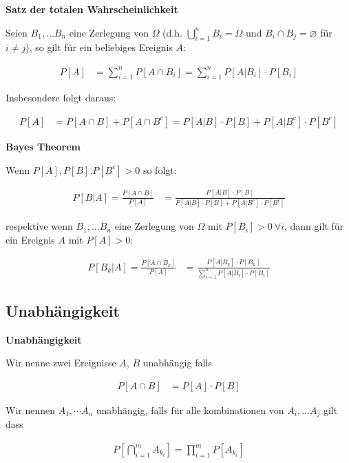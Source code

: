 \documentclass[25pt]{sciposter}
\newenvironment{method}[1]{\begin{mdframed}[backgroundcolor=blue!10,innertopmargin=15pt, innerbottommargin=15pt,nobreak=true]
		\textbf{#1 }
	}
	{ 
	\end{mdframed}
}
\newenvironment{thm}[1]{\begin{mdframed}[backgroundcolor=pink!50,innertopmargin=15pt, innerbottommargin=15pt, nobreak=true]
		\textbf{#1 }
	}
	{ 
	\end{mdframed}
}
\begin{document}
\begin{multicols}{3}
\begin{thm}{Satz der totalen Wahrscheinlichkeit}
	 Seien $B_1, \ldots B_n$ eine Zerlegung von $\Omega$ (d.h. $\bigcup_{i=1}^n B_i = \Omega$ und $B_i \cap B_j = \varnothing$ für $i\neq j$), so gilt für ein beliebiges Ereignis $A$:
	 
	 \begin{align*}
	 	P[A] &= \sum_{i=1}^{n} P[A\cap B_i] = \sum_{i=1}^{n} P[A|B_i]\cdot P[B_i]
	 \end{align*}
	 
	 Insbesondere folgt daraus:
	 
	 \begin{align*}
	 	P[A] &= P[A\cap B] + P[A \cap B^c] = P[A|B]\cdot P[B] + P[A|B^c]\cdot P[B^c]
	 \end{align*}
\end{thm}


\begin{thm}{Bayes Theorem}
	Wenn $P[A],P[B].P[B^c]> 0$ so folgt:
	
	\begin{align*}
		P[B|A] = \frac{P[A\cap B]}{P[A]} &= \frac{P[A|B]\cdot P[B]}{P[A|B]\cdot P[B] + P[A|B^c]\cdot P[B^c]}
	\end{align*}
	
	respektive wenn $B_1, \ldots B_n$ eine Zerlegung von $\Omega$ mit $P[B_i]>0 \  \forall i$, dann gilt für ein Ereignis $A$ mit $P[A]>0$:
	
	\begin{align*}
		P[B_k|A] = \frac{P[A\cap B_k]}{P[A]} &= \frac{P[A|B_k]\cdot P[B_k]}{\sum_{i=1}^{n} P[A|B_i] \cdot P[B_i] }
	\end{align*}
\end{thm}


\subsection*{Unabhängigkeit}

\begin{method}{Unabhängigkeit}
	
	Wir nenne zwei Ereignisse $A$, $B$ unabhängig falls
	
	\begin{align*}
		P[A\cap B] &= P[A] \cdot P[B]
	\end{align*}
	
	
	Wir nennen $A_1,\cdots A_n$ unabhängig, falls für alle kombinationen von $A_i, \ldots A_j$ gilt dass
	
	\begin{align*}
		P\left[\bigcap_{i=1}^{m} A_{k_i} \right] = \prod_{i=1}^{m}P[A_{k_i}]
	\end{align*}
	

\end{method}
\end{multicols}
\end{document}
